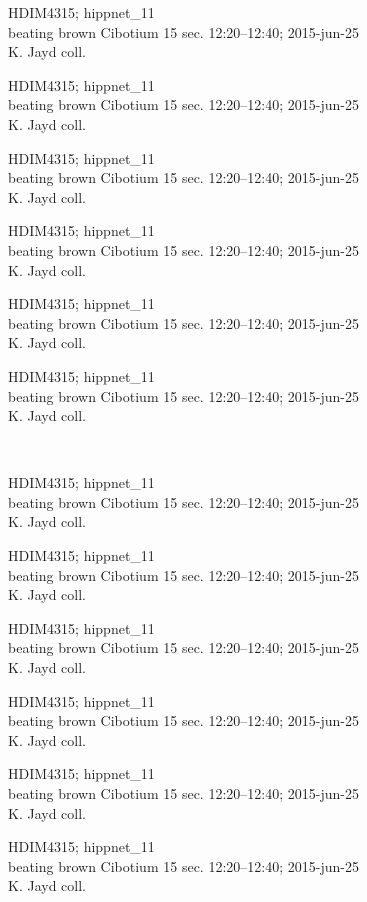 \documentclass[2pt]{extarticle}
\begin{document}
\noindent
\parbox{0.16\textwidth}{\tiny \raggedright \rule[-0.3\baselineskip]{0pt}{10pt}HDIM4315; hippnet\_11\\ beating brown Cibotium 15 sec. 12:20--12:40; 2015-jun-25\\ K. Jayd coll.}
\parbox{0.16\textwidth}{\tiny \raggedright \rule[-0.3\baselineskip]{0pt}{10pt}HDIM4315; hippnet\_11\\ beating brown Cibotium 15 sec. 12:20--12:40; 2015-jun-25\\ K. Jayd coll.}
\parbox{0.16\textwidth}{\tiny \raggedright \rule[-0.3\baselineskip]{0pt}{10pt}HDIM4315; hippnet\_11\\ beating brown Cibotium 15 sec. 12:20--12:40; 2015-jun-25\\ K. Jayd coll.}
\parbox{0.16\textwidth}{\tiny \raggedright \rule[-0.3\baselineskip]{0pt}{10pt}HDIM4315; hippnet\_11\\ beating brown Cibotium 15 sec. 12:20--12:40; 2015-jun-25\\ K. Jayd coll.}
\parbox{0.16\textwidth}{\tiny \raggedright \rule[-0.3\baselineskip]{0pt}{10pt}HDIM4315; hippnet\_11\\ beating brown Cibotium 15 sec. 12:20--12:40; 2015-jun-25\\ K. Jayd coll.}
\parbox{0.16\textwidth}{\tiny \raggedright \rule[-0.3\baselineskip]{0pt}{10pt}HDIM4315; hippnet\_11\\ beating brown Cibotium 15 sec. 12:20--12:40; 2015-jun-25\\ K. Jayd coll.} \\ 
\vspace{0.001in} 

\noindent
\parbox{0.16\textwidth}{\tiny \raggedright \rule[-0.3\baselineskip]{0pt}{10pt}HDIM4315; hippnet\_11\\ beating brown Cibotium 15 sec. 12:20--12:40; 2015-jun-25\\ K. Jayd coll.}
\parbox{0.16\textwidth}{\tiny \raggedright \rule[-0.3\baselineskip]{0pt}{10pt}HDIM4315; hippnet\_11\\ beating brown Cibotium 15 sec. 12:20--12:40; 2015-jun-25\\ K. Jayd coll.}
\parbox{0.16\textwidth}{\tiny \raggedright \rule[-0.3\baselineskip]{0pt}{10pt}HDIM4315; hippnet\_11\\ beating brown Cibotium 15 sec. 12:20--12:40; 2015-jun-25\\ K. Jayd coll.}
\parbox{0.16\textwidth}{\tiny \raggedright \rule[-0.3\baselineskip]{0pt}{10pt}HDIM4315; hippnet\_11\\ beating brown Cibotium 15 sec. 12:20--12:40; 2015-jun-25\\ K. Jayd coll.}
\parbox{0.16\textwidth}{\tiny \raggedright \rule[-0.3\baselineskip]{0pt}{10pt}HDIM4315; hippnet\_11\\ beating brown Cibotium 15 sec. 12:20--12:40; 2015-jun-25\\ K. Jayd coll.}
\parbox{0.16\textwidth}{\tiny \raggedright \rule[-0.3\baselineskip]{0pt}{10pt}HDIM4315; hippnet\_11\\ beating brown Cibotium 15 sec. 12:20--12:40; 2015-jun-25\\ K. Jayd coll.} \\ 
\vspace{0.001in} 
\end{document}
